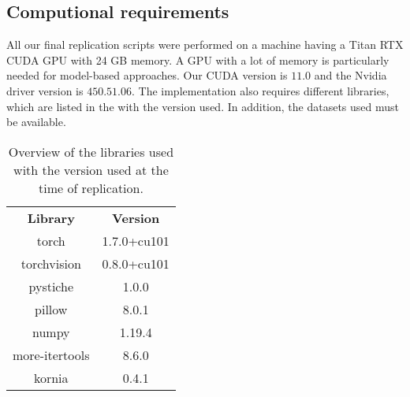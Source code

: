 \subsection{Computional requirements}

All our final replication scripts were performed on a machine having a Titan RTX CUDA GPU with 24 GB memory. A GPU with a lot of memory is particularly needed for model-based approaches. Our CUDA version is $11.0$ and the Nvidia driver version is $450.51.06$. The implementation also requires different libraries, which are listed in the   with the version used. In addition, the datasets used must be available. 

\begin{table*}[h]
	\caption{Overview of the libraries used with the version used at the time of replication.}
	\label{tab:libraries}
	\centering
	\small
	\begin{tabular}{c|c}
		\hline
		\bfseries Library & \bfseries Version\\
		torch & 1.7.0+cu101\\
		torchvision &  0.8.0+cu101\\
		pystiche & 1.0.0\\
		pillow & 8.0.1\\
		numpy & 1.19.4\\
		more-itertools & 8.6.0\\
		kornia & 0.4.1 \\
		\hline
	\end{tabular}
\end{table*}